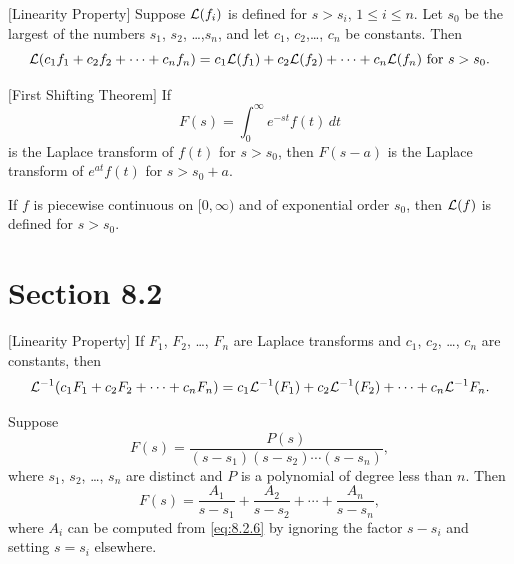 \setcounter{theorem}{1}
\begin{theorem}
  $[$Linearity Property$]$\label{thmtype:8.1.2} Suppose ${\cal L}(f_{i})$ is defined for $s>s_{i}$,
  $1\le i\le n$. Let $s_{0}$ be the largest of the numbers $s_{1}$, $s_{2}$, \dots,$s_{n}$, and let
  $c_{1}$, $c_{2}$,\dots, $c_{n}$ be constants. Then
  \[
    {\cal L}(c_{1}f_{1}+c_{2}f_{2}+\cdots+c_{n}f_{n})=c_{1}{\cal L}(f_{1})+c_{2}{\cal L}(f_{2}) +\cdots+c_{n}{\cal L}(f_{n})\mbox{ for }s>s_{0}.
  \]
\end{theorem}

\setcounter{theorem}{2}
\setcounter{equation}{9}
\begin{theorem}
  $[$First Shifting Theorem$]$\label{thmtype:8.1.3} If
  \begin{equation}
    \label{eq:8.1.10}F(s)=\int_{0}^{\infty}e^{-st}f(t)\,dt
  \end{equation}
  is the Laplace transform of $f(t)$ for $s>s_{0}$, then $F(s-a)$ is the Laplace transform of
  $e^{at}f(t)$ for $s>s_{0}+a$.
\end{theorem}

\setcounter{theorem}{5}
\begin{theorem}
  \label{thmtype:8.1.6} If $f$ is piecewise continuous on $[0,\infty)$ and of exponential order
  $s_{0}$, then ${\cal L}(f)$ is defined for $s>s_{0}$.
\end{theorem}

\section*{Section 8.2}
\setcounter{chapter}{8}
\setcounter{section}{2}

\setcounter{theorem}{0}
\begin{theorem}
  $[$Linearity Property$]$\label{thmtype:8.2.1} If $F_{1}$, $F_{2}$, \dots, $F_{n}$ are Laplace
  transforms and $c_{1}$, $c_{2}$, \dots, $c_{n}$ are constants, then
  \[
    {\cal L}^{-1}(c_{1}F_{1}+c_{2}F_{2}+\cdots+c_{n}F_{n})=c_{1}{\cal L}^{-1}(F_{1})+c_{2}{\cal L}^{-1}(F_{2})+\cdots+c_{n}{\cal L}^{-1}F_{n}.
  \]
\end{theorem}

\setcounter{theorem}{1}
\setcounter{equation}{5}
\begin{theorem}
  \label{thmtype:8.2.2} Suppose
  \begin{equation}
    \label{eq:8.2.6}F(s)=\frac{P(s)}{(s-s_{1})(s-s_{2})\cdots(s-s_{n})},
  \end{equation}
  where $s_{1}$, $s_{2}$, \dots, $s_{n}$ are distinct and $P$ is a polynomial of degree less than
  $n$. Then
  \[
    F(s)=\frac{A_{1}}{s-s_{1}}+\frac{A_{2}}{s-s_{2}}+\cdots+\frac{A_{n}}{s-s_{n}},
  \]
  where $A_{i}$ can be computed from \eqref{eq:8.2.6} by ignoring the factor $s-s_{i}$ and setting
  $s=s_{i}$ elsewhere.
\end{theorem}

